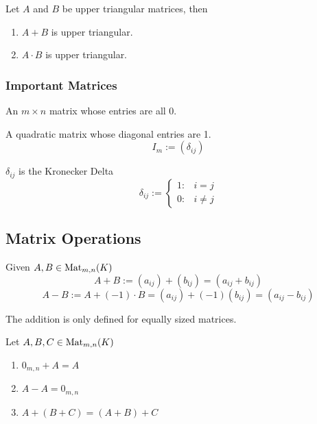 \begin{proposition}
   Let \(A\) and \(B\) be upper triangular matrices, then
   \begin{enumerate}[label=\roman*, align=Center]
      \item \(A + B\) is upper triangular.
      \item \(A \cdot B\) is upper triangular.
   \end{enumerate}
\end{proposition}

\subsubsection{Important Matrices}
\begin{definition}
   An \(m \times n \) matrix whose entries are all \(0\).
\end{definition}

\begin{definition}
   A quadratic matrix whose diagonal entries are 1.
   \[I_m := (\delta_{ij})\]
\end{definition}
\begin{remark}
   \(\delta_{ij}\) is the Kronecker Delta
   \[\delta_{ij} := \begin{cases} 1: & i=j\\ 0: & i \neq j\end{cases}\]
\end{remark}

\subsection{Matrix Operations}
\begin{definition}
   Given \(A, B \in \operatorname{Mat}_{m,n}(K)\)
   \[A + B := (a_{ij}) + (b_{íj}) = (a_{ij} + b_{ij})\]
   \[A - B := A + (-1) \cdot B = (a_{ij}) + (-1)(b_{ij}) = (a_{ij} - b_{ij})\]
\end{definition}
\begin{remark}
   The addition is only defined for equally sized matrices.
\end{remark}

\begin{proposition}
   Let \(A, B, C \in \operatorname{Mat}_{m,n}(K)\)
   \begin{enumerate}[label=\roman*, align=Center]
      \item \(0_{m,n} + A = A\)
      \item \(A - A = 0_{m,n}\)
      \item \(A + (B + C) = (A + B) + C\)
   \end{enumerate}
\end{proposition}

